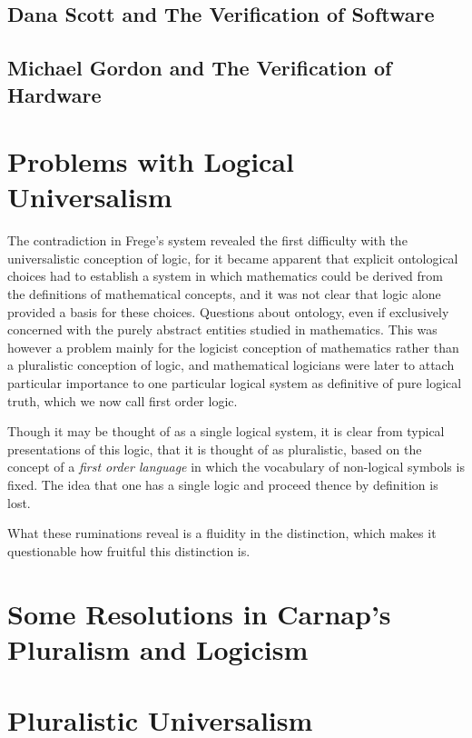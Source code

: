   \subsection{Dana Scott and The Verification of Software}

  \subsection{Michael Gordon and The Verification of Hardware}

  \section{Problems with Logical Universalism}

  The contradiction in Frege's system revealed the first difficulty with the universalistic conception of logic, for it became apparent that explicit ontological choices had to establish a system in which mathematics could be derived from the definitions of mathematical concepts, and it was not clear that logic alone provided a basis for these choices.
  Questions about ontology, even if exclusively concerned with the purely abstract entities studied in mathematics.
  This was however a problem mainly for the logicist conception of mathematics rather than a pluralistic conception of logic, and mathematical logicians were later to attach particular importance to one particular logical system as definitive of pure logical truth, which we now call first order logic.

  Though it may be thought of as a single logical system, it is clear from typical presentations of this logic, that it is thought of as pluralistic, based on the concept of a \emph{first order language} in which the vocabulary of non-logical symbols is fixed.
  The idea that one has a single logic and proceed thence by definition is lost.

  What these ruminations reveal is a fluidity in the distinction, which makes it questionable how fruitful this distinction is.

  \section{Some Resolutions in Carnap's Pluralism and Logicism}

  

  \section{Pluralistic Universalism}
  
